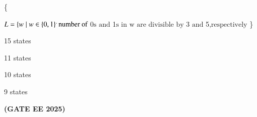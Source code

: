 \documentclass[journal,12pt,onecolumn]{IEEEtran}
\theoremstyle{remark}
\begin{document}
\begin{enumerate}
        
 

      
  
      
\{
      
 
$L=\{w\mid w \in  \left\{0,1\right\} ^ . \text{number of }  $0$\text{s and }$1$\text{s in w are divisible by } $3$ \text{ and } $5$\text{,respectively}$
 \}
      
  
  
    \begin{enumerate}
\begin{multicols}{4}
        
    
        \item 15 states 
        \item 11 states 
        \item 10 states
        \item 9 states 
        \end{multicols}
    \end{enumerate}
    \hfill \textbf{(GATE EE 2025)}
   

\end{enumerate}
\end{document}
